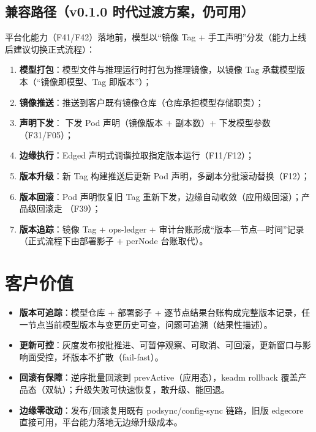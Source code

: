 \subsection{兼容路径（v0.1.0 时代过渡方案，仍可用）}

平台化能力（F41/F42）落地前，模型以“镜像 Tag + 手工声明”分发（能力上线后建议切换正式流程）：

\begin{enumerate}
  \item \textbf{模型打包}：模型文件与推理运行时打包为推理镜像，以镜像 Tag 承载模型版本（“镜像即模型、Tag 即版本”）；
  \item \textbf{镜像推送}：推送到客户既有镜像仓库（仓库承担模型存储职责）；
  \item \textbf{声明下发}： 下发 Pod 声明（镜像版本 + 副本数）+  下发模型参数（F31/F05）；
  \item \textbf{边缘执行}：Edged 声明式调谐拉取指定版本运行（F11/F12）；
  \item \textbf{版本升级}：新 Tag 构建推送后更新 Pod 声明，多副本分批滚动替换（F12）；
  \item \textbf{版本回滚}：Pod 声明恢复旧 Tag 重新下发，边缘自动收敛（应用级回滚）；产品级回滚走 （F39）；
  \item \textbf{版本追踪}：镜像 Tag + ops-ledger + 审计台账形成“版本—节点—时间”记录（正式流程下由部署影子 + perNode 台账取代）。
\end{enumerate}

\section{客户价值}

\begin{itemize}
  \item \textbf{版本可追踪}：模型仓库 + 部署影子 + 逐节点结果台账构成完整版本记录，任一节点当前模型版本与变更历史可查，问题可追溯（结果性描述）。
  \item \textbf{更新可控}：灰度发布按批推进、可暂停观察、可取消、可回滚，更新窗口与影响面受控，坏版本不扩散（fail-fast）。
  \item \textbf{回滚有保障}：逆序批量回滚到 prevActive（应用态），keadm rollback 覆盖产品态（双轨）；升级失败可快速恢复，敢升级、能回退。
  \item \textbf{边缘零改动}：发布/回滚复用既有 podsync/config-sync 链路，旧版 edgecore 直接可用，平台能力落地无边缘升级成本。
\end{itemize}